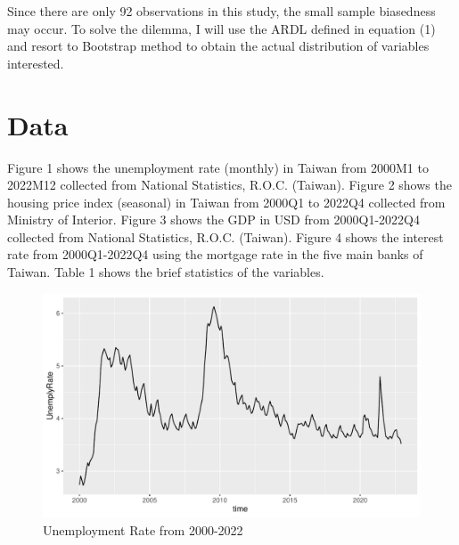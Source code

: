 \documentclass[12pt]{article}
\begin{document}
\begin{spacing}{2}
\hspace*{0.5cm}Since there are only 92 observations in this study, the small sample biasedness may occur. To solve the dilemma, I will use the ARDL defined in equation (1) and resort to Bootstrap method to obtain the actual distribution of variables interested.
\section{Data}
Figure 1 shows the unemployment rate (monthly) in Taiwan from 2000M1 to 2022M12 collected from National Statistics, R.O.C. (Taiwan). Figure 2 shows the housing price index (seasonal) in Taiwan from 2000Q1 to 2022Q4 collected from Ministry of Interior. Figure 3 shows the GDP in USD from 2000Q1-2022Q4 collected from National Statistics, R.O.C. (Taiwan). Figure 4 shows the interest rate from 2000Q1-2022Q4 using the mortgage rate in the five main banks of Taiwan.
Table 1 shows the brief statistics of the variables.

\begin{figure}[H] %
\centering %
\includegraphics[width=1\textwidth]{unemploymentRate.pdf} %
\caption{Unemployment Rate from 2000-2022} %
\label{Fig.main1} %
\end{figure}


\end{spacing}
\end{document}
